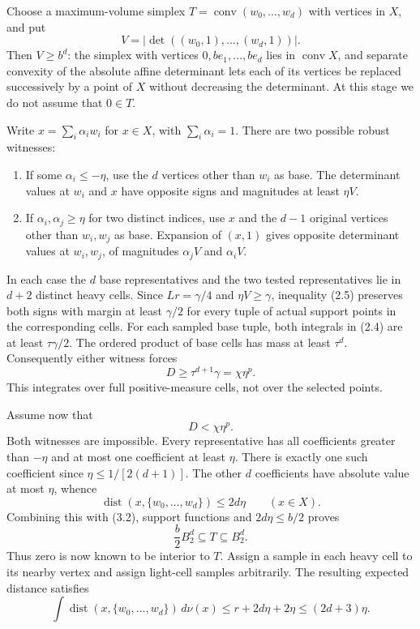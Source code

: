 \documentclass[
  11pt,
]{article}
\providecommand{\tightlist}{%
  \setlength{\itemsep}{0pt}\setlength{\parskip}{0pt}}
\begin{document}
Choose a maximum-volume simplex
\(T=\operatorname{conv}(w_0,\ldots,w_d)\) with vertices in \(X\), and
put \[V=|\det((w_0,1),\ldots,(w_d,1))|.\] Then \(V\ge b^d\): the simplex
with vertices \(0,be_1,\ldots,be_d\) lies in \(\operatorname{conv}X\),
and separate convexity of the absolute affine determinant lets each of
its vertices be replaced successively by a point of \(X\) without
decreasing the determinant. At this stage we do not assume that
\(0\in T\).

Write \(x=\sum_i\alpha_iw_i\) for \(x\in X\), with \(\sum_i\alpha_i=1\).
There are two possible robust witnesses:

\begin{enumerate}
\def\labelenumi{\arabic{enumi}.}
\tightlist
\item
  If some \(\alpha_i\le-\eta\), use the \(d\) vertices other than
  \(w_i\) as base. The determinant values at \(w_i\) and \(x\) have
  opposite signs and magnitudes at least \(\eta V\).
\item
  If \(\alpha_i,\alpha_j\ge\eta\) for two distinct indices, use \(x\)
  and the \(d-1\) original vertices other than \(w_i,w_j\) as base.
  Expansion of \((x,1)\) gives opposite determinant values at
  \(w_i,w_j\), of magnitudes \(\alpha_jV\) and \(\alpha_iV\).
\end{enumerate}

In each case the \(d\) base representatives and the two tested
representatives lie in \(d+2\) distinct heavy cells. Since
\(Lr=\gamma/4\) and \(\eta V\ge\gamma\), inequality (2.5) preserves both
signs with margin at least \(\gamma/2\) for every tuple of actual
support points in the corresponding cells. For each sampled base tuple,
both integrals in (2.4) are at least \(\tau\gamma/2\). The ordered
product of base cells has mass at least \(\tau^d\). Consequently either
witness forces \[D\ge\tau^{d+1}\gamma=\chi\eta^p.\tag{3.3}\] This
integrates over full positive-measure cells, not over the selected
points.

Assume now that \[D<\chi\eta^p.\tag{3.4}\] Both witnesses are
impossible. Every representative has all coefficients greater than
\(-\eta\) and at most one coefficient at least \(\eta\). There is
exactly one such coefficient since \(\eta\le1/[2(d+1)]\). The other
\(d\) coefficients have absolute value at most \(\eta\), whence
\[\operatorname{dist}(x,\{w_0,\ldots,w_d\})\le2d\eta
\qquad(x\in X).\] Combining this with (3.2), support functions and
\(2d\eta\le b/2\) proves
\[\frac b2 B_2^d\subseteq T\subseteq B_2^d.\tag{3.5}\] Thus zero is now
known to be interior to \(T\). Assign a sample in each heavy cell to its
nearby vertex and assign light-cell samples arbitrarily. The resulting
expected distance satisfies
\[\int\operatorname{dist}(x,\{w_0,\ldots,w_d\})\,d\nu(x)
\le r+2d\eta+2\eta\le(2d+3)\eta.\tag{3.6}\]
\end{document}
